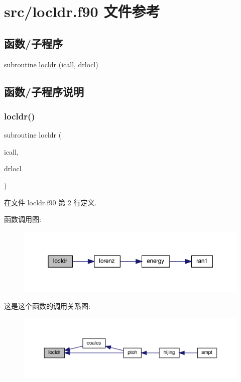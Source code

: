 \hypertarget{locldr_8f90}{}\section{src/locldr.f90 文件参考}
\label{locldr_8f90}
\subsection*{函数/子程序}
\begin{DoxyCompactItemize}
\item 
subroutine \mbox{\hyperlink{locldr_8f90_a03841de5b42c3d4c18f09c99a1b21619}{locldr}} (icall, drlocl)
\end{DoxyCompactItemize}


\subsection{函数/子程序说明}
\mbox{\label{locldr_8f90_a03841de5b42c3d4c18f09c99a1b21619}} 
\subsubsection{\texorpdfstring{locldr()}{locldr()}}
{\footnotesize\ttfamily subroutine locldr (\begin{DoxyParamCaption}\item[{}]{icall,  }\item[{}]{drlocl }\end{DoxyParamCaption})}



在文件 locldr.\+f90 第 2 行定义.

函数调用图\+:
\nopagebreak
\begin{figure}[H]
\begin{center}
\leavevmode
\includegraphics[width=350pt]{locldr_8f90_a03841de5b42c3d4c18f09c99a1b21619_cgraph}
\end{center}
\end{figure}
这是这个函数的调用关系图\+:
\nopagebreak
\begin{figure}[H]
\begin{center}
\leavevmode
\includegraphics[width=350pt]{locldr_8f90_a03841de5b42c3d4c18f09c99a1b21619_icgraph}
\end{center}
\end{figure}
